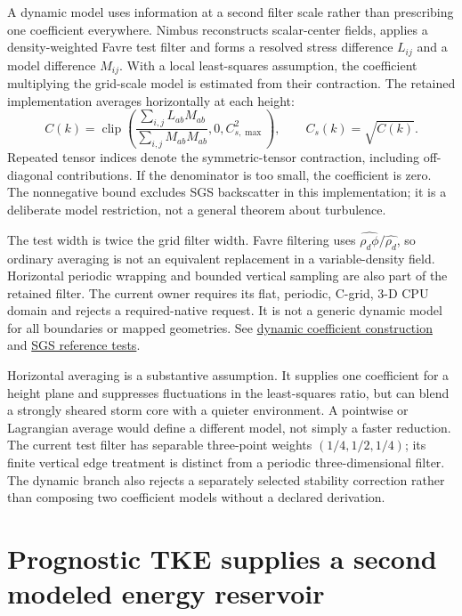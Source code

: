 A dynamic model uses information at a second filter scale rather than prescribing
one coefficient everywhere. Nimbus reconstructs scalar-center fields, applies
a density-weighted Favre test filter and forms a resolved stress difference
$L_{ij}$ and a model difference $M_{ij}$. With a local least-squares assumption,
the coefficient multiplying the grid-scale model is estimated from their
contraction. The retained implementation averages horizontally at each height:
\[
 C(k)=\operatorname{clip}\!\left(
 \frac{\sum_{i,j}L_{ab}M_{ab}}{\sum_{i,j}M_{ab}M_{ab}},
 0,C_{s,\max}^2\right),\qquad C_s(k)=\sqrt{C(k)}.
\]
Repeated tensor indices denote the symmetric-tensor contraction, including
off-diagonal contributions. If the denominator is too small, the coefficient
is zero. The nonnegative bound excludes SGS backscatter in this implementation;
it is a deliberate model restriction, not a general theorem about turbulence.

The test width is twice the grid filter width. Favre filtering uses
$\widehat{\rho_d\phi}/\widehat{\rho_d}$, so ordinary averaging is not an
equivalent replacement in a variable-density field. Horizontal periodic
wrapping and bounded vertical sampling are also part of the retained filter.
The current owner requires its flat, periodic, C-grid, 3-D CPU domain and
rejects a required-native request. It is not a generic dynamic model for all
boundaries or mapped geometries. See
\href{../src/turbulence/schemes/smagorinsky/dynamic_smagorinsky.cpp}{dynamic
coefficient construction} and
\href{../tests/physics/test_turbulence_sgs.cpp}{SGS reference tests}.

Horizontal averaging is a substantive assumption. It supplies one coefficient
for a height plane and suppresses fluctuations in the least-squares ratio,
but can blend a strongly sheared storm core with a quieter environment. A
pointwise or Lagrangian average would define a different model, not simply a
faster reduction. The current test filter has separable three-point weights
$(1/4,1/2,1/4)$; its finite vertical edge treatment is distinct from a periodic
three-dimensional filter. The dynamic branch also rejects a separately
selected stability correction rather than composing two coefficient models
without a declared derivation.

\section{Prognostic TKE supplies a second modeled energy reservoir}

